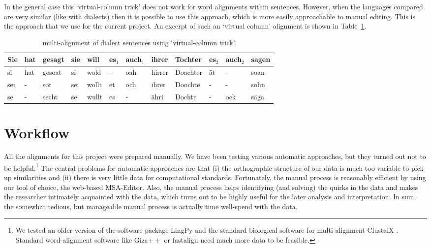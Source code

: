 \documentclass[11pt]{article}
\begin{document}
In the general case this `virtual-column trick' does not work for word alignments within sentences. However, when the languages compared are very similar (like with dialects) then it is possible to use this approach, which is more easily approachable to manual editing. This is the approach that we use for the current project. An excerpt of such an `virtual column' alignment is shown in Table~\ref{tab:wenker_example}.

\begin{table}[htbp]
  \small
  \centering
  \begin{tabular}{llllllllllll} 
	\hline
	Sie & hat & gesagt & sie & will & es$_1$ & auch$_1$ & ihrer & Tochter & es$_2$ & auch$_2$ & sagen \\
	\hline
	si & hat & gesoat & si & wold & - & oah & hirrer & Doachter & ät & - & soan \\
    sei & - & sot & sei & wollt & et & och & ihrer & Doochte & - & - & sohn \\
    se & - & secht & se & wullt & es & - & ähri & Dochtr & - & ock & säga \\
    \hline
  \end{tabular}
  \caption{multi-alignment of dialect sentences using `virtual-column trick'}
  \label{tab:wenker_example}
\end{table}

\section{Workflow}

All the alignments for this project were prepared manually. We have been testing various automatic approaches, but they turned out not to be helpful.\footnote{We tested an older version of the software package LingPy \parencite{list2017lingpy} and the standard biological software for multi-alignment ClustalX \parencite{Larkin2007}. Standard word-alignment software like Giza$++$ \parencite{och2003} or fastalign \parencite{dyer2013} need much more data to be feasible.} The central problems for automatic approaches are that (i) the orthographic structure of our data is much too variable to pick up similarities and (ii) there is very little data for computational standards. Fortunately, the manual process is reasonably efficient by using our tool of choice, the web-based MSA-Editor. Also, the manual process helps identifying (and solving) the quirks in the data and makes the researcher intimately acquainted with the data, which turns out to be highly useful for the later analysis and interpretation. In sum, the somewhat tedious, but manageable manual process is actually time well-spend with the data.
\end{document}
